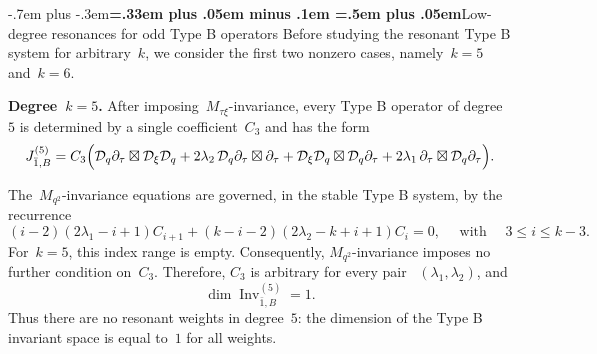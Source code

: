 \documentclass[12pt,a4paper]{amsart}
\makeatletter
\providecommand{\headspaces}{\spaceskip=.33em plus .05em minus .1em \xspaceskip=.5em plus .05em}
\def\subsubsection{\@startsection{subsubsection}{3}{0pt}{-1ex \@plus -.4ex \@minus -.2ex}%
  {-.7em plus -.3em}{\normalfont\normalsize\bfseries\boldmath\headspaces}}
\theoremstyle{thm}
\theoremstyle{definition}
\newcommand {\Dq}{\cD_q}
\newcommand {\Dxi}{\cD_\xi}
\makeatother
\begin{document}
\subsubsection{Low-degree resonances for odd Type B operators}
Before studying the resonant Type B system for arbitrary~\(k\), we
consider the first two nonzero cases, namely~\(k=5\) and~\(k=6\).

{\bf Degree~\(k=5\).} After imposing~\(M_{\tau\xi}\)-invariance, every Type B operator of
degree~\(5\) is determined by a single coefficient~\(C_3\) and has the
form
\[
\begin{array}{r@{}l}
J_{\bar1,B}^{(5)}
=
C_3\Bigl(
&\Dq\partial_\tau\boxtimes \Dxi\Dq
+
2\lambda_2\,\Dq\partial_\tau\boxtimes \partial_\tau
+
\Dxi\Dq\boxtimes \Dq\partial_\tau
+
2\lambda_1\,\partial_\tau\boxtimes \Dq\partial_\tau
\Bigr).
\end{array}
\]

The~\(M_{q^2}\)-invariance equations are governed, in the stable
Type B system, by the recurrence
\[
(i-2)(2\lambda_1-i+1)C_{i+1}
+
(k-i-2)(2\lambda_2-k+i+1)C_i
=
0,
\quad
\text{ with }
\quad
3\leq i\leq k-3.
\]
For~\(k=5\), this index range is empty. Consequently,
\(M_{q^2}\)-invariance imposes no further condition on~\(C_3\).
Therefore, \(C_3\) is arbitrary for every pair~%
\((\lambda_1,\lambda_2)\), and
\[
\dim\operatorname{Inv}_{\bar1,B}^{(5)}=1.
\]
Thus there are no resonant weights in degree~\(5\): the dimension of
the Type B invariant space is equal to~\(1\) for all weights.
\end{document}
